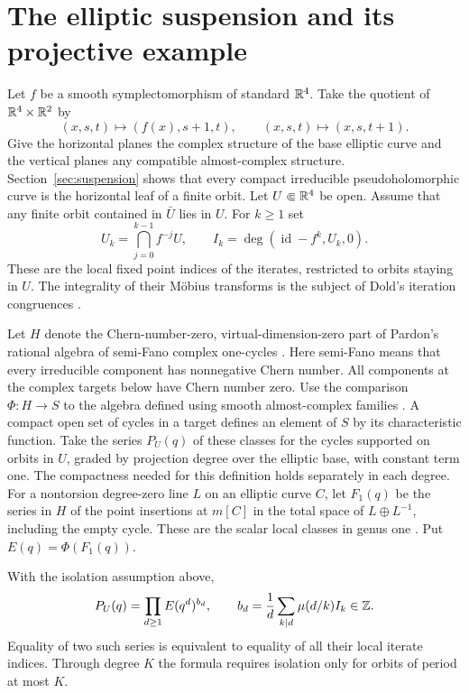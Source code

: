 \section{The elliptic suspension and its projective example}
\label{sec:elliptic-series}

Let $f$ be a smooth symplectomorphism of standard $\mathbb R^4$.
Take the quotient of $\mathbb R^4\times\mathbb R^2$ by
\[
  (x,s,t)\longmapsto(f(x),s+1,t),\qquad
  (x,s,t)\longmapsto(x,s,t+1).
\]
Give the horizontal planes the complex structure of the base elliptic
curve and the vertical planes any compatible almost-complex structure.
Section~\ref{sec:suspension} shows that every compact irreducible
pseudoholomorphic curve is the horizontal leaf of a finite orbit.
Let $U\Subset\mathbb R^4$ be open. Assume that any finite orbit contained
in $\bar U$ lies in $U$. For $k\ge1$ set
\[
 U_k=\bigcap_{j=0}^{k-1}f^{-j}U,\qquad
 I_k=\deg(\operatorname{id}-f^k,U_k,0).
\]
These are the local fixed point indices of the iterates, restricted to
orbits staying in $U$. The integrality of their M\"obius transforms is
the subject of Dold's iteration congruences \cite{Dold}.

Let $H$ denote the Chern-number-zero, virtual-dimension-zero part of
Pardon's rational algebra of semi-Fano complex one-cycles \cite{pardon}.
Here semi-Fano means that every irreducible component has nonnegative
Chern number. All components at the complex targets below have Chern
number zero.
Use the comparison $\Phi:H\to S$ to the algebra defined using smooth
almost-complex families \cite[\S2]{WueProduct}. A compact open set of cycles in
a target defines an element of $S$ by its characteristic function. Take
the series $P_U(q)$ of these classes for the cycles supported on orbits
in $U$, graded by projection degree over the elliptic base, with constant
term one. The compactness needed for this definition holds separately
in each degree. For a nontorsion degree-zero line $L$ on an elliptic curve
$C$, let $F_1(q)$ be the series in $H$ of the point insertions at
$m[C]$ in the total space of $L\oplus L^{-1}$, including the empty cycle.
These are the scalar local classes in genus one
\cite[Definition~4.7]{pardon}. Put $E(q)=\Phi(F_1(q))$.

\begin{theorem}\label{thm:index}
With the isolation assumption above,
\[
 P_U(q)=\prod_{d\ge1} E(q^d)^{b_d},\qquad
 b_d=\frac{1}{d}\sum_{k\mid d}\mu(d/k) I_k\in\mathbb Z .
\]
Equality of two such series is equivalent to equality of all their local
iterate indices. Through degree $K$ the formula requires isolation only
for orbits of period at most $K$.
\end{theorem}

